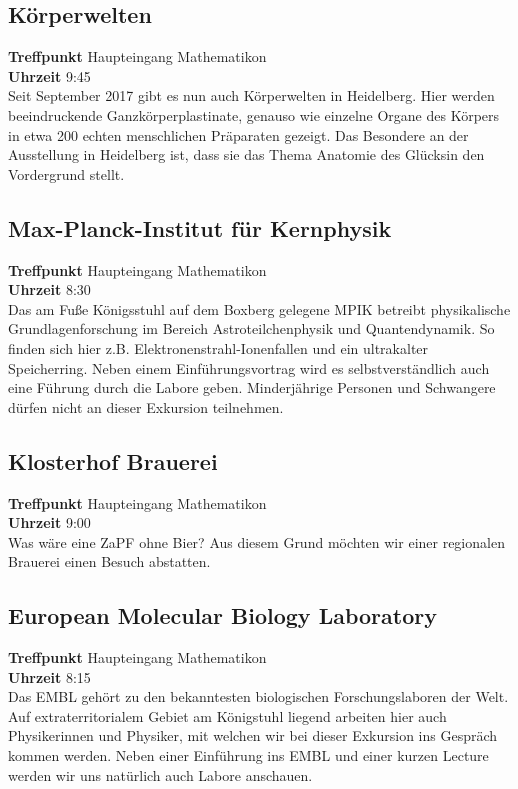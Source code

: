\subsection*{Körperwelten}
\textbf{Treffpunkt} Haupteingang Mathematikon\\
\textbf{Uhrzeit} 9:45\\
Seit September 2017 gibt es nun auch Körperwelten in Heidelberg. Hier werden beeindruckende Ganzkörperplastinate, genauso wie einzelne Organe des Körpers in etwa 200 echten menschlichen Präparaten gezeigt. Das Besondere an der Ausstellung in Heidelberg ist, dass sie das Thema \flqq Anatomie des Glücks\frqq in den Vordergrund stellt. 

\subsection*{Max-Planck-Institut für Kernphysik}
\textbf{Treffpunkt} Haupteingang Mathematikon\\
\textbf{Uhrzeit} 8:30\\
Das am Fuße Königsstuhl auf dem Boxberg gelegene MPIK betreibt physikalische Grundlagenforschung im Bereich Astroteilchenphysik und Quantendynamik. So finden sich hier z.B. Elektronenstrahl-Ionenfallen und ein ultrakalter Speicherring. Neben einem Einführungsvortrag wird es selbstverständlich auch eine Führung durch die Labore geben. Minderjährige Personen und Schwangere dürfen nicht an dieser Exkursion teilnehmen. 

\subsection*{Klosterhof Brauerei}
\textbf{Treffpunkt} Haupteingang Mathematikon\\
\textbf{Uhrzeit} 9:00\\
Was wäre eine ZaPF ohne Bier? Aus diesem Grund möchten wir einer regionalen Brauerei einen Besuch abstatten. 

\subsection*{European Molecular Biology Laboratory}
\textbf{Treffpunkt} Haupteingang Mathematikon \\
\textbf{Uhrzeit} 8:15\\
Das EMBL gehört zu den bekanntesten biologischen Forschungslaboren der Welt. Auf extraterritorialem Gebiet am Königstuhl liegend arbeiten hier auch Physikerinnen und Physiker, mit welchen wir bei dieser Exkursion ins Gespräch kommen werden. Neben einer Einführung ins EMBL und einer kurzen \flqq Lecture \frqq werden wir uns natürlich auch Labore anschauen.

